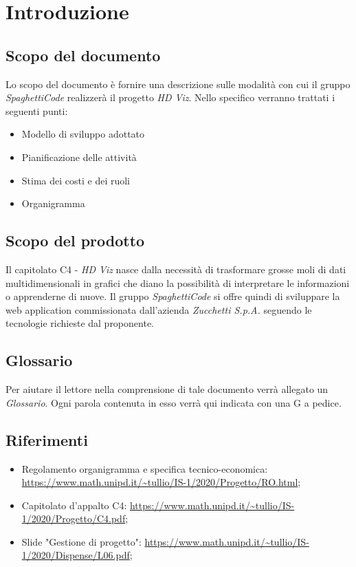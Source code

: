 \documentclass{article}
\begin{document}


\section{Introduzione}%
\label{sec:introduzione}

\subsection{Scopo del documento}%
\label{sub:scopo_del_documento}
Lo scopo del documento è fornire una descrizione sulle modalità con cui il gruppo \emph{SpaghettiCode} realizzerà il progetto \emph{HD Viz}. Nello specifico verranno trattati i seguenti punti:
\begin{itemize}
	\item Modello di sviluppo adottato
	\item Pianificazione delle attività
	\item Stima dei costi e dei ruoli
	\item Organigramma
\end{itemize}

\subsection{Scopo del prodotto}%
\label{sub:scopo_prodotto}
Il capitolato C4 - \emph{HD Viz} nasce dalla necessità di trasformare grosse moli di dati multidimensionali in grafici che diano la possibilità di interpretare le informazioni o apprenderne di nuove. Il gruppo \emph{SpaghettiCode} si offre quindi di sviluppare la web application commissionata dall’azienda \emph{Zucchetti S.p.A.} seguendo le tecnologie richieste dal proponente.

\subsection{Glossario}%
\label{sub:glossario}
Per aiutare il lettore nella comprensione di tale documento verrà allegato un \emph{Glossario}. Ogni parola contenuta in esso verrà qui indicata con una G a pedice.

\subsection{Riferimenti}%
\label{sub:riferimenti}
\begin{itemize}
	\item Regolamento organigramma e specifica tecnico-economica: \url{https://www.math.unipd.it/~tullio/IS-1/2020/Progetto/RO.html};
	\item Capitolato d’appalto C4: \url{https://www.math.unipd.it/~tullio/IS-1/2020/Progetto/C4.pdf};
	\item Slide "Gestione di progetto": \url{https://www.math.unipd.it/~tullio/IS-1/2020/Dispense/L06.pdf};
\end{itemize}
\end{document}
